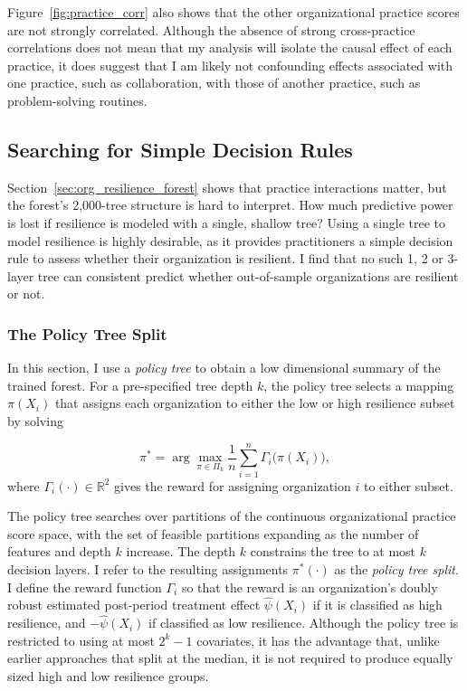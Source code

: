 \documentclass[12pt,notitlepage]{article}
\begin{document}
Figure~\ref{fig:practice_corr} also shows that the other organizational practice scores are not strongly correlated.   
Although the absence of strong cross-practice correlations does not mean that my analysis will isolate the causal effect of each practice, it does suggest that I am likely not confounding effects associated with one practice, such as collaboration, with those of another practice, such as problem-solving routines. 

\iffalse
\subsection{Searching for Simple Decision Rules}\label{sec:policy_tree}
Section~\ref{sec:org_resilience_forest} shows that practice interactions matter, but the forest’s 2,000-tree structure is hard to interpret. 
How much predictive power is lost if resilience is modeled with a single, shallow tree? 
Using a single tree to model resilience is highly desirable, as it provides practitioners a simple decision rule to assess whether their organization is resilient.
I find that no such 1, 2 or 3-layer tree can consistent predict whether out-of-sample organizations are resilient or not. 

\subsubsection{The Policy Tree Split}

In this section, I use a \textit{policy tree} \citep{athey_policy_2021} to obtain a low dimensional summary of the trained forest. 
For a pre-specified tree depth $k$, the policy tree selects a mapping $\pi(X_i)$ that assigns each organization to either the low  or high resilience subset by solving

\begin{equation}
    \pi^*=\arg\max_{\pi\in\Pi_k} \frac{1}{n}\sum_{i=1}^n \Gamma_i\big(\pi(X_i)\big),
\end{equation}
where $\Gamma_i(\cdot)\in\mathbb{R}^2$ gives the reward for assigning organization $i$ to either subset.

The policy tree searches over partitions of the continuous organizational practice score space, with the set of feasible partitions expanding as the number of features and depth $k$ increase. 
The depth $k$ constrains the tree to at most $k$ decision layers.
I refer to the resulting assignments $\pi^{*}(\cdot)$ as the \textit{policy tree split}. 
I define the reward function $\Gamma_i$ so that the reward is an organization's doubly robust estimated post-period treatment effect $\hat{\psi}(X_i)$ if it is classified as high resilience, and $-\hat{\psi}(X_i)$ if classified as low resilience.
Although the policy tree is restricted to using at most $2^{k}-1$ covariates, it has the advantage that, unlike earlier approaches that split at the median, it is not required to produce equally sized high and low resilience groups.
\end{document}

